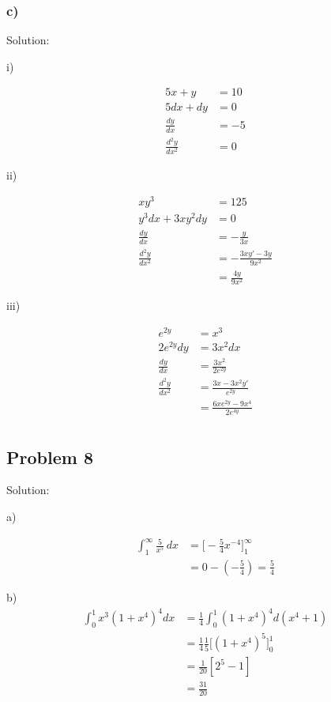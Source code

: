 \documentclass[letterpaper, 11pt]{article}
\newcommand{\1}{\mathds{1}}	%
\theoremstyle{definition}
\begin{document}
\subsubsection*{c)}

Solution:

i)

\begin{align*}
  5x + y &= 10 \\
  5dx + dy &= 0 \\
  \frac{dy}{dx} &= -5 \\ 
  \frac{d ^{2}y}{dx ^{2}} &= 0
\end{align*}

ii)

\begin{align*}
  xy ^{3} &= 125 \\
  y ^{3} dx + 3xy ^{2}dy &= 0 \\ 
  \frac{dy}{dx} &= -\frac{y}{3x} \\
  \frac{d ^{2}y}{dx ^{2}} &= - \frac{3xy' - 3y}{9x ^{2}} \\
  &= \frac{4y}{9x ^{2}}
\end{align*}


iii)

\begin{align*}
  e ^{2y} &= x ^{3} \\
  2e ^{2y} dy &= 3x ^{2} dx \\
  \frac{dy}{dx} &= \frac{3x ^{2}}{2e ^{2y}} \\ 
  \frac{d ^{2}y}{dx ^{2}} &= \frac{3x - 3x ^{2}y'}{e ^{2y}} \\
  &= \frac{6xe ^{2y} - 9x ^{4}}{2e ^{4y}} \\
\end{align*}

\subsection*{Problem 8}

Solution:

a)

\begin{align*}
  \int_{1}^{\infty } \frac{5}{x ^{5}} \, dx &= \Big[- \frac{5}{4}x ^{-4}\Big]_{1}^{\infty} \\
  &= 0-(-\frac{5}{4}) = \frac{5}{4}
\end{align*}

b)
\begin{align*}
  \int_{0}^{1} x ^{3}(1 +x ^{4})^{4} dx &= \frac{1}{4}\int_{0}^{1}(1+x ^{4})^{4} d(x ^{4}+1) \\
  &= \frac{1}{4} \frac{1}{5} \Big[(1+x ^{4} )^{5} \Big]_{0}^{1} \\
  &= \frac{1}{20}[2 ^{5} - 1] \\
  &= \frac{31}{20}
\end{align*}
\end{document}
